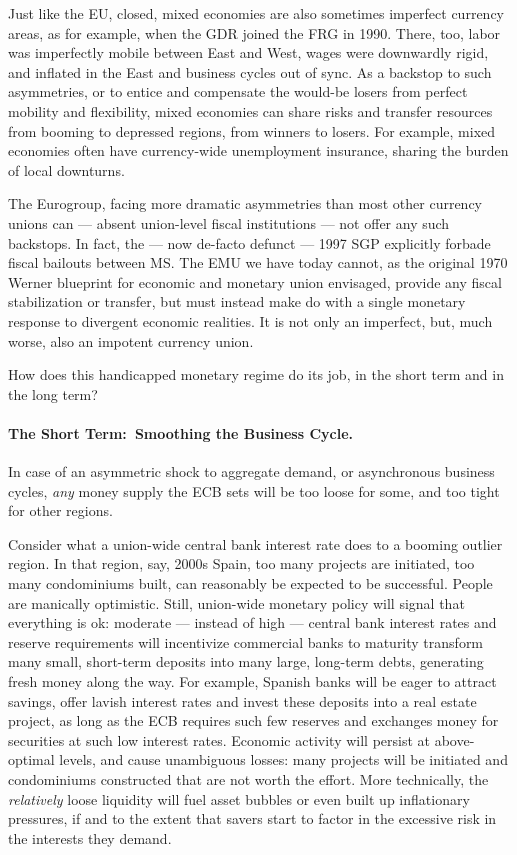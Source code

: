 Just like the \gls{EU}, closed, mixed economies are also sometimes imperfect currency areas, as for example, when the \gls{GDR} joined the \gls{FRG} in 1990.
There, too, labor was imperfectly mobile between East and West, wages were downwardly rigid, and inflated in the East and business cycles out of sync.
As a backstop to such asymmetries, or to entice and compensate the would-be losers from perfect mobility and flexibility, mixed economies can share risks and transfer resources from booming to depressed regions, from winners to losers.
For example, mixed economies often have currency-wide unemployment insurance, sharing the burden of local downturns.

The Eurogroup, facing more dramatic asymmetries than most other currency unions can --- absent union-level fiscal institutions --- not offer any such backstops.
In fact, the --- now de-facto defunct --- 1997 \gls{SGP} explicitly forbade fiscal bailouts between \gls{MS}.
The \gls{EMU} we have today cannot, as the original 1970 Werner blueprint for economic and monetary union envisaged, provide any fiscal stabilization or transfer, but must instead make do with a single monetary response to divergent economic realities.
It is not only an imperfect, but, much worse, also an impotent currency union.

How does this handicapped monetary regime do its job, in the short term and in the long term?

\paragraph[Short Term]{The Short Term:~Smoothing the Business Cycle.}
In case of an asymmetric shock to aggregate demand, or asynchronous business cycles, \emph{any} money supply the \gls{ECB} sets will be too loose for some, and too tight for other regions.

Consider what a union-wide central bank interest rate does to a booming outlier region.
In that region, say, 2000s Spain, too many projects are initiated, too many condominiums built, can reasonably be expected to be successful.
People are manically optimistic.
Still, union-wide monetary policy will signal that everything is ok:
moderate --- instead of high --- central bank interest rates and reserve requirements will incentivize commercial banks to maturity transform many small, short-term deposits into many large, long-term debts, generating fresh money along the way.
For example, Spanish banks will be eager to attract savings, offer lavish interest rates and invest these deposits into a real estate project, as long as the \gls{ECB} requires such few reserves and exchanges money for securities at such low interest rates.
Economic activity will persist at above-optimal levels, and cause unambiguous losses:
many projects will be initiated and condominiums constructed that are not worth the effort.
More technically, the \emph{relatively} loose liquidity will fuel asset bubbles or even built up inflationary pressures, if and to the extent that savers start to factor in the excessive risk in the interests they demand.


